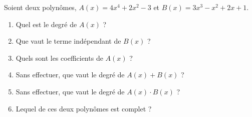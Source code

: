 %
%
    Soient deux polynômes,
    \(A(x) = 4x^4 + 2x^2 - 3\) et \(B(x) = 3x^3 - x^2 + 2x + 1\).
    \begin{enumerate}
        \item Quel est le degré de \(A(x)\) ?
        \item Que vaut le terme indépendant de \(B(x)\) ?
        \item Quels sont les coefficients de \(A(x)\) ?
        \item Sans effectuer, que vaut le degré de \(A(x) + B(x)\) ?
        \item Sans effectuer, que vaut le degré de \(A(x) \cdot B(x)\) ?
        \item Lequel de ces deux polynômes est complet ?
    \end{enumerate}
